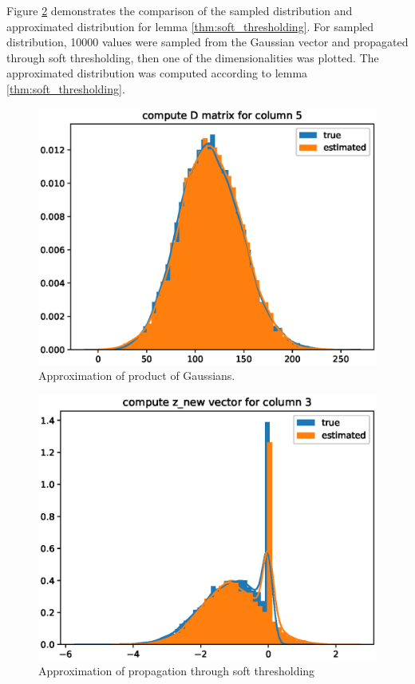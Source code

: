 \documentclass[letterpaper]{article}
\begin{document}
Figure \ref{fig:z_new_testing} demonstrates the comparison of the sampled distribution and approximated distribution for lemma \ref{thm:soft_thresholding}. For sampled distribution, 10000 values were sampled from the Gaussian vector and propagated through soft thresholding, then one of the dimensionalities was plotted. The approximated distribution was computed according to lemma \ref{thm:soft_thresholding}.
\begin{figure}[t]
\includegraphics[width=\columnwidth]{d_testing}
\caption{Approximation of product of Gaussians.}
\label{fig:d_testing}
\end{figure}

\begin{figure}[t]
\includegraphics[width=\columnwidth]{z_new_testing}
\caption{Approximation of propagation through soft thresholding}
\label{fig:z_new_testing}
\end{figure}
\end{document}
